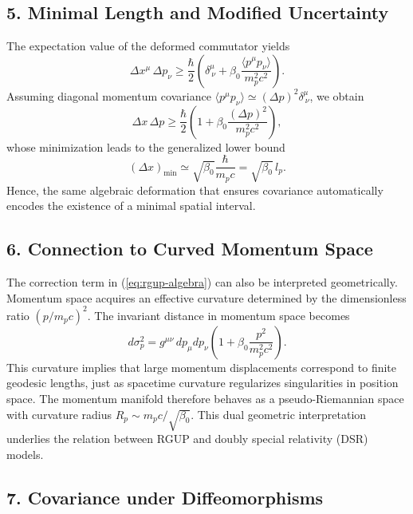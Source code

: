 \documentclass[11pt,oneside]{book}
\numberwithin{equation}{chapter}
\newcommand{\mpx}{m_p}               %
\newcommand{\betaz}{\beta_0}
\begin{document}
\subsection*{5. Minimal Length and Modified Uncertainty}

The expectation value of the deformed commutator yields
\begin{equation}
\Delta x^\mu\,\Delta p_\nu
\ge
\frac{\hbar}{2}\left(\delta^\mu_{\ \nu}
+ \betaz\frac{\langle p^\mu p_\nu\rangle}{\mpx^2 c^2}\right).
\end{equation}
Assuming diagonal momentum covariance $\langle p^\mu p_\nu\rangle \simeq (\Delta p)^2 \delta^\mu_{\ \nu}$,
we obtain
\begin{equation}
\Delta x\,\Delta p
\ge \frac{\hbar}{2}\left(1+\betaz\frac{(\Delta p)^2}{\mpx^2 c^2}\right),
\end{equation}
whose minimization leads to the generalized lower bound
\begin{equation}
(\Delta x)_{\min} \simeq \sqrt{\betaz}\frac{\hbar}{\mpx c}
= \sqrt{\betaz}\,l_p.
\end{equation}
Hence, the same algebraic deformation that ensures covariance 
automatically encodes the existence of a minimal spatial interval.

\subsection*{6. Connection to Curved Momentum Space}

The correction term in (\ref{eq:rgup-algebra}) can also be interpreted geometrically.
Momentum space acquires an effective curvature
determined by the dimensionless ratio $(p/\mpx c)^2$.
The invariant distance in momentum space becomes
\begin{equation}
d\sigma_p^2
= g^{\mu\nu}\,dp_\mu dp_\nu
\left(1+\betaz\frac{p^2}{\mpx^2 c^2}\right).
\end{equation}
This curvature implies that large momentum displacements correspond to finite geodesic lengths,
just as spacetime curvature regularizes singularities in position space.
The momentum manifold therefore behaves as a pseudo-Riemannian space with curvature radius
$R_p \sim \mpx c / \sqrt{\betaz}$.
This dual geometric interpretation underlies the relation between RGUP and doubly special relativity (DSR) models.
\clearpage
\subsection*{7. Covariance under Diffeomorphisms}
\end{document}
